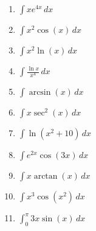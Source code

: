\documentclass[12pt]{article}
\newif\ifans
\begin{document}
\begin{enumerate}

\item $\int xe^{4x}\,dx$ 

\ifans{\fbox{$\frac{x}{4}e^{4x}-\frac{1}{16}e^{4x}+C$}} \fi

\item $\int x^2\cos{(x)}\,dx$ 

\ifans{\fbox{$x^2\sin{x}+2x\cos{x}-2\sin{x}+C$}} \fi

\item $\int x^2\ln{(x)}\,dx$ 

\ifans{\fbox{$\frac{1}{3}x^3\ln{x}-\frac{1}{9}x^3+C$}} \fi

\item $\int{\frac{\ln{x}}{x^4}} \,dx$

\ifans{\fbox{$-\frac{1}{3}x^{-3}\ln{x}-\frac{1}{9}x^{-3}+C$}} \fi

\item $\int \arcsin{(x)}\,dx$ 

\ifans{\fbox{$x\arcsin{x}+\sqrt{1-x^2}+C$}} \fi

\item $\int x\sec^2{(x)}\,dx$ 

\ifans{\fbox{$x\tan{x}+\ln{|\cos{x}|}+C$}} \fi

\item $\int \ln{(x^2+10)}\,dx$ 

\ifans{\fbox{$x\ln{(x^2+10)}-2x+2\sqrt{10}\arctan{\left(\frac{x}{\sqrt{10}}\right)}+C$; Detailed Solution: \textcolor{blue}{\href{http://www.math.drexel.edu/classes/Calculus/resources/Math122HW/Solutions/122_11_Parts_07.pdf}{Here}}}} \fi

\item $\int e^{2x}\cos{(3x)}\,dx$ 

\ifans{\fbox{$\frac{2}{13}e^{2x}\cos{(3x)}+\frac{3}{13}e^{2x}\sin{(3x)}+C$; Detailed Solution: \textcolor{blue}{\href{http://www.math.drexel.edu/classes/Calculus/resources/Math122HW/Solutions/122_11_Parts_08.pdf}{Here}}}} \fi

\item $\int x\arctan{(x)}\,dx$

\ifans{\fbox{$\frac{x^2}{2}\tan^{-1}x-\frac{x}{2}+\frac{1}{2}\tan^{-1}x+C$}} \fi

\item $\int x^3 \cos{(x^2)} \,dx$

\ifans{\fbox{$\frac{1}{2}\cos{(x^2)}+\frac{1}{2}x^2\sin{(x^2)}+C$}} \fi

\item $\int_{0}^{\pi}3x\sin{(x)}\,dx$ 


\end{enumerate}
\end{document}
